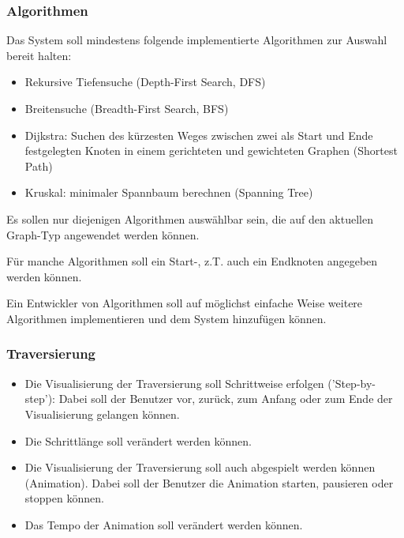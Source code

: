 \subsubsection{Algorithmen}
\label{subsubsec:Algorithmen}
Das System soll mindestens folgende implementierte Algorithmen zur Auswahl bereit halten:
\begin{itemize}
  \item Rekursive Tiefensuche (Depth-First Search, DFS)
  \item Breitensuche (Breadth-First Search, BFS)
  \item Dijkstra: Suchen des k\"urzesten Weges zwischen zwei als Start und Ende festgelegten Knoten in einem gerichteten und gewichteten Graphen (Shortest Path)
  \item Kruskal: minimaler Spannbaum berechnen (Spanning Tree)
\end{itemize}
Es sollen nur diejenigen Algorithmen ausw\"ahlbar sein, die auf den aktuellen Graph-Typ angewendet werden k\"onnen.

F\"ur manche Algorithmen soll ein Start-, z.T. auch ein Endknoten angegeben werden k\"onnen.

Ein Entwickler von Algorithmen soll auf m\"oglichst einfache Weise weitere Algorithmen implementieren und dem System hinzuf\"ugen k\"onnen.
% 
\subsubsection{Traversierung}
\label{subsubsec:Traversierung}
\begin{itemize}
  \item Die Visualisierung der Traversierung soll Schrittweise erfolgen ('Step-by-step'): Dabei soll der Benutzer vor, zur\"uck, zum Anfang oder zum Ende der Visualisierung gelangen k\"onnen.
  \item Die Schrittl\"ange soll ver\"andert werden k\"onnen.
  \item Die Visualisierung der Traversierung soll auch abgespielt werden k\"onnen (Animation). Dabei soll der Benutzer die Animation starten, pausieren oder stoppen k\"onnen.
  \item Das Tempo der Animation soll ver\"andert werden k\"onnen.
\end{itemize}
% 
